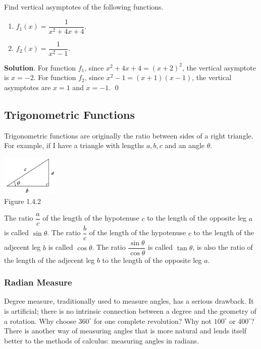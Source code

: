 \documentclass[11pt]{book}
\theoremstyle{break}
\theoremstyle{no_label}
\newcommand{\figtag}[1]{\\[-1.2em]Figure {#1}}
\numberwithin{equation}{section}
\begin{document}
\begin{example}
    Find vertical asymptotes of the following functions.
    \begin{enumerate}
        \item $f_1(x)=\dfrac{1}{x^2+4x+4}$.
        \item $f_2(x)=\dfrac{1}{x^2-1}$.
    \end{enumerate}
\end{example}
\textbf{Solution}. For function $f_1$, since $x^2+4x+4=(x+2)^2$, the vertical asymptote is $x=-2$. For function $f_2$, since $x^2-1=(x+1)(x-1)$, the vertical asymptotes are $x=1$ and $x=-1$. \qed

\subsection*{Trigonometric Functions}

Trigonometric functions are originally the ratio between sides of a right triangle. For example, if I have a triangle with lengths $a, b, c$ and an angle $\theta$.

\begin{center}
    \includegraphics[width=0.2\textwidth]{triangle.JPG}\figtag{1.4.2}
\end{center}

The ratio $\dfrac{a}{c}$ of the length of the hypotenuse $c$ to the length of the opposite leg $a$ is called $\sin\theta$. The ratio $\dfrac{b}{c}$ of the length of the hypotenuse $c$ to the length of the adjecent leg $b$ is called $\cos\theta$. The ratio $\dfrac{\sin\theta}{\cos\theta}$ is called $\tan\theta$, is also the ratio of the length of the adjecent leg $b$ to the length of the opposite leg $a$.

\subsubsection*{Radian Measure}

Degree measure, traditionally used to measure angles, has a serious
drawback. It is artificial; there is no intrinsic connection between a degree and the geometry of a rotation. Why choose $360^\circ$ for one complete revolution? Why not $100^\circ$ or $400^\circ$? There is another way of measuring angles that is more natural and lends itself better to the methods of calculus: measuring angles in radians.
\end{document}
